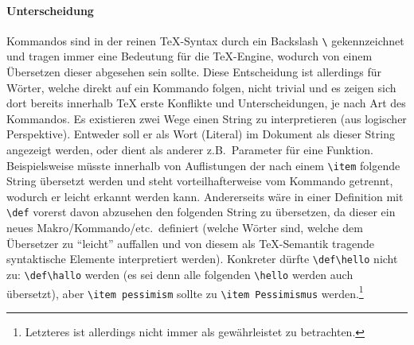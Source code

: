 \paragraph{Unterscheidung}\par
Kommandos sind in der reinen \TeX{}-Syntax durch ein Backslash \verb|\| gekennzeichnet und tragen immer eine Bedeutung für die \TeX{}-Engine, wodurch von einem Übersetzen dieser abgesehen sein sollte. 
Diese Entscheidung ist allerdings für Wörter, welche direkt auf ein Kommando folgen, nicht trivial und es zeigen sich dort bereits innerhalb \TeX{} erste Konflikte und Unterscheidungen, je nach Art des Kommandos.
Es existieren zwei Wege einen String zu interpretieren (aus logischer Perspektive). Entweder soll er als Wort (Literal) im Dokument als dieser String angezeigt werden, oder dient als anderer z.B.\ Parameter für eine Funktion.%
Beispielsweise müsste innerhalb von Auflistungen der nach einem \verb|\item| folgende String übersetzt werden und steht vorteilhafterweise vom Kommando getrennt, wodurch er leicht erkannt werden kann. Andererseits wäre in einer Definition mit \verb|\def| vorerst davon abzusehen den folgenden String zu übersetzen, da dieser ein neues Makro/Kommando/etc.\ definiert (welche Wörter sind, welche dem Übersetzer zu \enquote{leicht} auffallen und von diesem als \TeX{}-Semantik tragende syntaktische Elemente interpretiert werden). 
Konkreter dürfte \verb|\def\hello| nicht zu: \verb|\def\hallo| werden (es sei denn alle folgenden \verb|\hello| werden auch übersetzt), aber \verb|\item pessimism| sollte zu \verb|\item Pessimismus| werden.\footnote{Letzteres ist allerdings nicht immer als gewährleistet zu betrachten.}%




